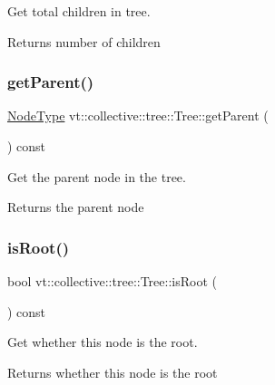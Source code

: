 Get total children in tree. 

\begin{DoxyReturn}{Returns}
number of children 
\end{DoxyReturn}
\mbox{\label{structvt_1_1collective_1_1tree_1_1_tree_ab509dada696b718152e8ac04edd551af}} 
\subsubsection{\texorpdfstring{get\+Parent()}{getParent()}}
{\footnotesize\ttfamily \hyperlink{namespacevt_a866da9d0efc19c0a1ce79e9e492f47e2}{Node\+Type} vt\+::collective\+::tree\+::\+Tree\+::get\+Parent (\begin{DoxyParamCaption}{ }\end{DoxyParamCaption}) const}



Get the parent node in the tree. 

\begin{DoxyReturn}{Returns}
the parent node 
\end{DoxyReturn}
\mbox{\label{structvt_1_1collective_1_1tree_1_1_tree_a88b2add909b0035f4844317481ed559b}} 
\subsubsection{\texorpdfstring{is\+Root()}{isRoot()}}
{\footnotesize\ttfamily bool vt\+::collective\+::tree\+::\+Tree\+::is\+Root (\begin{DoxyParamCaption}{ }\end{DoxyParamCaption}) const}



Get whether this node is the root. 

\begin{DoxyReturn}{Returns}
whether this node is the root 
\end{DoxyReturn}
\mbox{\label{structvt_1_1collective_1_1tree_1_1_tree_a56532f6b47b9c71864980b73deee2d5a}} 
